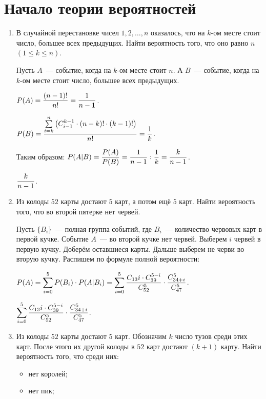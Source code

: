 \documentclass{article}
\begin{document}
\section*{Начало теории вероятностей}
\begin{enumerate}    
    \item В случайной перестановке чисел $1, 2, \ldots, n$ оказалось, что на $k$-ом месте стоит число, большее всех предыдущих. Найти вероятность того, что оно равно $n$ $(1 \leq k \leq n)$.

    \solution{}

    Пусть $A$~--- событие, когда на $k$-ом месте стоит $n$. А $B$~--- событие, когда на $k$-ом месте стоит число, большее всех предыдущих.

    $\displaystyle{P(A) = \frac{(n - 1)!}{n!}} = \frac{1}{n - 1}$.

    $\displaystyle{P(B) = \frac{\sum\limits_{i = k}^{n} \left( C_{i - 1}^{k - 1} \cdot (n - k)! \cdot (k - 1)! \right)}{n!}} = \frac{1}{k}$.

    Таким образом: $\displaystyle{P(A|B) = \frac{P(A)}{P(B)} = \frac{1}{n - 1} : \frac{1}{k} = \frac{k}{n - 1}}$.

    \answer{} $\displaystyle{\frac{k}{n - 1}}$.

    \item Из колоды $52$ карты достают $5$ карт, а потом ещё $5$ карт. Найти вероятность того, что во второй пятерке нет червей.

    \solution{}

    Пусть $\{B_i\}$~--- полная группа событий, где $B_i$~--- количество червовых карт в первой кучке. Событие $A$~--- во второй кучке нет червей. Выберем $i$ червей в первую кучку. Доберём оставшиеся карты. Дальше выберем не черви во вторую кучку. Распишем по формуле полной вероятности: 

    $\displaystyle{P(A) = \sum\limits_{i = 0}^5 P(B_i) \cdot P(A|B_i) = \sum\limits_{i = 0}^5 \frac{C_{13}{i} \cdot C_{39}^{5 - i}}{C_{52}^5} \cdot \frac{C_{34 + i}^5}{C_{47} ^ 5}}$.

    \answer{} $\displaystyle{  \sum\limits_{i = 0}^5 \frac{C_{13}{i} \cdot C_{39}^{5 - i}}{C_{52}^5} \cdot \frac{C_{34 + i}^5}{C_{47} ^ 5}}$.

    \item Из колоды $52$ карты достают $5$ карт. Обозначим $k$ число тузов среди этих карт. После этого их другой колоды в $52$ карт достают $(k + 1)$ карту. Найти вероятность того, что среди них:
    \begin{itemize}
        \item нет королей;
        \item нет пик;
    \end{itemize}


\end{enumerate}
\end{document}
